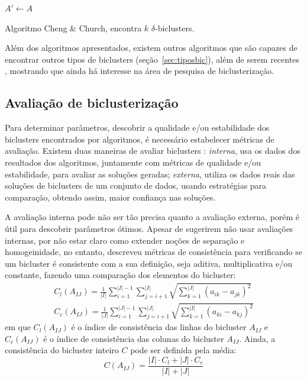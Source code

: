 \documentclass[normaltoc, espacoumemeio, pnumromarab,ruledheader]{abnt}
\begin{document}
\begin{algorithm}[h]
\label{algo:cc4}
 $A' \leftarrow A$\;
 \caption{Algoritmo Cheng \& Church, encontra $k$ $\delta$-biclusters.}
\end{algorithm}


Além dos algoritmos apresentados, existem outros algoritmos que são capazes de encontrar outros tipos de biclusters (seção~\ref{sec:tiposbic}), além de serem recentes \cite{Yang2013,Hochreiter2010,Cabanes2012}, mostrando que ainda há interesse na área de pesquisa de biclusterização.

 \subsection{Avaliação de biclusterização}

Para determinar parâmetros, descobrir a qualidade e/ou estabilidade dos biclusters encontrados por algoritmos, é necessário estabelecer métricas de avaliação. Existem duas maneiras de avaliar biclusters \cite{Hochreiter2010}: \textit{interna}, usa os dados dos resultados dos algoritmos, juntamente com métricas de qualidade e/ou estabilidade, para avaliar as soluções geradas; \textit{externa}, utiliza os dados reais das soluções de biclusters de um conjunto de dados, usando estratégias para comparação, obtendo assim, maior confiança nas soluções.

A avaliação interna pode não ser tão precisa quanto a avaliação externa, porém é útil para descobrir parâmetros ótimos. Apesar de  sugerirem não usar avaliações internas, por não estar claro como extender noções de separação e homogeinidade, no entanto,  descreveu métricas de consistência para verificando se um bicluster é consistente com a sua definição, seja aditiva, multiplicativa e/ou constante, fazendo uma comparação dos elementos do bicluster:
\begin{equation}
\begin{split}
C_l(A_{IJ}) = \frac{1}{|I|} \displaystyle\sum_{i = 1}^{|I| - 1} \displaystyle\sum_{j = i + 1}^{|I|} \sqrt{ \displaystyle\sum_{k = 1}^{|J|} (a_{ik} - a_{jk})^2 } \\
C_c(A_{IJ}) = \frac{1}{|J|} \displaystyle\sum_{i = 1}^{|J| - 1} \displaystyle\sum_{j = i + 1}^{|J|} \sqrt{ \displaystyle\sum_{k = 1}^{|I|} (a_{ki} - a_{kj})^2 }
\end{split}
\end{equation}
em que $C_l(A_{IJ})$ é o índice de consistência das linhas do bicluster $A_{IJ}$ e $C_c(A_{IJ})$ é o índice de consistência das colunas do bicluster $A_{IJ}$. Ainda, a consistência do bicluster inteiro $C$ pode ser definida pela média:
\begin{equation}
C(A_{IJ}) = \frac{|I| \cdot C_l + |J| \cdot C_c}{|I| + |J|}
\end{equation}
\end{document}
